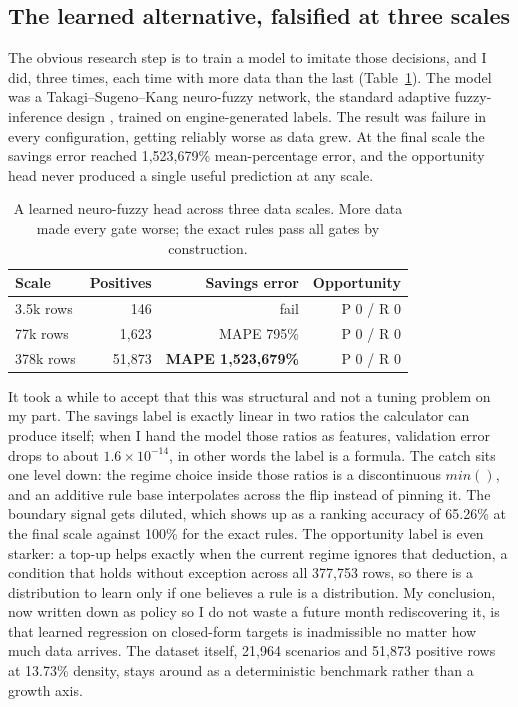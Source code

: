 \documentclass[conference]{IEEEtran}
\newcommand{\thead}[1]{\textbf{#1}}
\begin{document}
\subsection{The learned alternative, falsified at three scales}
The obvious research step is to train a model to imitate those
decisions, and I did, three times, each time with more data than the
last (Table~\ref{tab:tsk}). The model was a Takagi--Sugeno--Kang
neuro-fuzzy network, the standard adaptive fuzzy-inference design
\cite{takagi1985, jang1993}, trained on engine-generated labels. The
result was failure in every configuration, getting reliably worse as
data grew. At the final scale the savings error reached 1{,}523{,}679\%
mean-percentage error, and the opportunity head never produced a
single useful prediction at any scale.

\begin{table}[t]
\caption{A learned neuro-fuzzy head across three data scales. More
data made every gate worse; the exact rules pass all gates by
construction.}
\label{tab:tsk}
\centering
\footnotesize
\begin{tabular}{@{}lrrr@{}}
\toprule
\rowcolor{black!6}
\thead{Scale} & \thead{Positives} & \thead{Savings error} & \thead{Opportunity} \\
\midrule
3.5k rows & 146 & fail & P 0 / R 0 \\
77k rows & 1{,}623 & MAPE 795\% & P 0 / R 0 \\
378k rows & 51{,}873 & \textbf{MAPE 1{,}523{,}679\%} & P 0 / R 0 \\
\bottomrule
\end{tabular}
\end{table}

It took a while to accept that this was structural and not a tuning
problem on my part. The savings label is exactly linear in two ratios
the calculator can produce itself; when I hand the model those ratios
as features, validation error drops to about $1.6 \times 10^{-14}$, in
other words the label is a formula. The catch sits one level down: the
regime choice inside those ratios is a discontinuous $min()$, and an
additive rule base interpolates across the flip instead of pinning
it. The boundary signal gets diluted, which shows up as a ranking
accuracy of 65.26\% at the final scale against 100\% for the exact
rules. The opportunity label is even starker: a top-up helps exactly
when the current regime ignores that deduction, a condition that holds
without exception across all 377{,}753 rows, so there is a
distribution to learn only if one believes a rule is a distribution.
My conclusion, now written down as policy so I do not waste a future
month rediscovering it, is that learned regression on closed-form
targets is inadmissible no matter how much data arrives. The dataset
itself, 21{,}964 scenarios and 51{,}873 positive rows at 13.73\%
density, stays around as a deterministic benchmark rather than a
growth axis.
\end{document}
